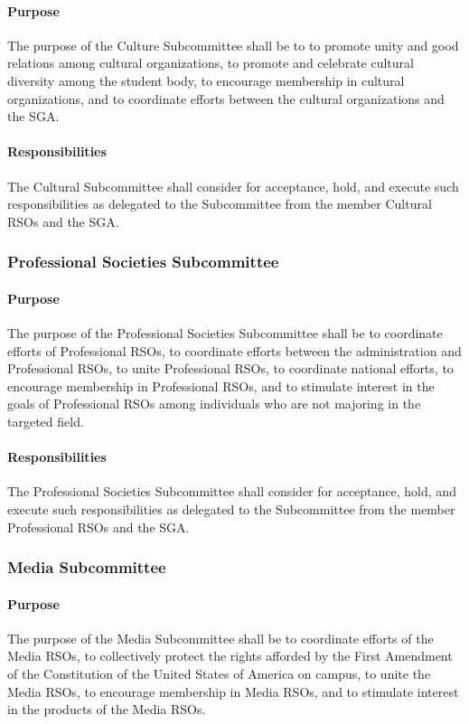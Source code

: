 \documentclass[12pt]{scrreprt}
\begin{document}
\paragraph{Purpose}
The purpose of the Culture Subcommittee shall be to to promote unity and good relations among cultural organizations, to promote and celebrate cultural diversity
among the student body, to encourage membership in cultural organizations, and to coordinate efforts between the cultural organizations and the SGA.

\paragraph{Responsibilities}
The Cultural Subcommittee shall consider for acceptance, hold, and
execute such responsibilities as delegated to the Subcommittee from the member Cultural RSOs and the SGA.

\subsubsection{Professional Societies Subcommittee}

\paragraph{Purpose}
The purpose of the Professional Societies Subcommittee shall be to coordinate
efforts of Professional RSOs, to coordinate efforts between the administration and
Professional RSOs, to unite Professional RSOs, to coordinate national efforts, to encourage
membership in Professional RSOs, and to stimulate interest in the goals of Professional
RSOs among individuals who are not majoring in the targeted field.

\paragraph{Responsibilities}
The Professional Societies Subcommittee shall consider for
acceptance, hold, and execute such responsibilities as delegated to the Subcommittee from
the member Professional RSOs and the SGA.

\subsubsection{Media Subcommittee}

\paragraph{Purpose}
The purpose of the Media Subcommittee shall be to coordinate efforts of the
Media RSOs, to collectively protect the rights afforded by the First Amendment of the
Constitution of the United States of America on campus, to unite the Media RSOs, to
encourage membership in Media RSOs, and to stimulate interest in the products of the
Media RSOs.
\end{document}

